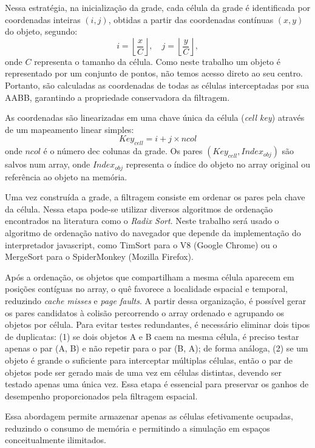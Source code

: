 Nessa estratégia, na inicialização da grade, cada célula da grade é identificada por coordenadas inteiras $(i, j)$, obtidas a partir das coordenadas contínuas $(x, y)$ do objeto, segundo:
$$
i = \left\lfloor \frac{x}{C} \right\rfloor, \quad
j = \left\lfloor \frac{y}{C} \right\rfloor,
$$
onde $C$ representa o tamanho da célula. Como neste trabalho um objeto é representado por um conjunto de pontos, não temos acesso direto ao seu centro. Portanto, são calculadas as coordenadas de todas as células interceptadas por sua AABB, garantindo a propriedade conservadora da filtragem.

As coordenadas são linearizadas em uma chave única da célula (\textit{cell key}) através de um mapeamento linear simples:
$$Key_{cell} = i + j \times ncol$$
onde $ncol$ é o número dec colunas da grade. Os pares $(Key_{cell}, Index_{obj})$ são salvos num array, onde $Index_{obj}$ representa o índice do objeto no array original ou referência ao objeto na memória.

Uma vez construída a grade, a filtragem consiste em ordenar os pares pela chave da célula. Nessa etapa pode-se utilizar diversos algoritmos de ordenação encontrados na literatura como o \textit{Radix Sort}. Neste trabalho será usado o algoritmo de ordenação nativo do navegador que depende da implementação do interpretador javascript, como TimSort para o V8 (Google Chrome) ou o MergeSort para o SpiderMonkey (Mozilla Firefox).

Após a ordenação, os objetos que compartilham a mesma célula aparecem em posições contíguas no array, o quê favorece a localidade espacial e temporal, reduzindo \textit{cache misses} e \textit{page faults}. A partir dessa organização, é possível gerar os pares candidatos à colisão percorrendo o array ordenado e agrupando os objetos por célula. Para evitar testes redundantes, é necessário eliminar dois tipos de duplicatas: (1) se dois objetos A e B caem na mesma célula, é preciso testar apenas o par (A, B) e não repetir para o par (B, A); de forma análoga, (2) se um objeto é grande o suficiente para interceptar múltiplas células, então o par de objetos pode ser gerado mais de uma vez em células distintas, devendo ser testado apenas uma única vez. Essa etapa é essencial para preservar os ganhos de desempenho proporcionados pela filtragem espacial.

Essa abordagem permite armazenar apenas as células efetivamente ocupadas, reduzindo o consumo de memória e permitindo a simulação em espaços conceitualmente ilimitados.

